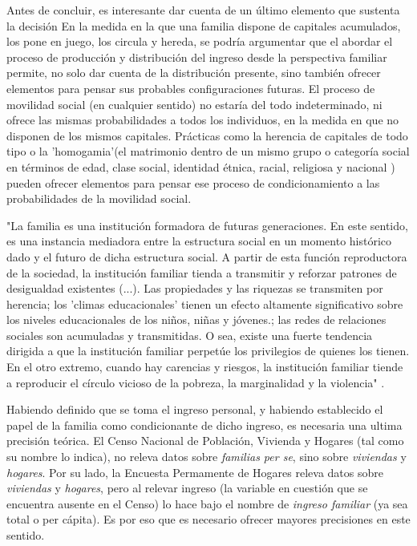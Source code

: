 	
	Antes de concluir, es interesante dar cuenta de un último elemento que sustenta la decisión En la medida en la que una familia dispone de capitales acumulados, los pone en juego, los circula y hereda, se podría argumentar que el abordar el proceso de producción y distribución del ingreso desde la perspectiva familiar permite, no solo dar cuenta de la distribución presente, sino también ofrecer elementos para pensar sus probables configuraciones futuras. El proceso de movilidad social (en cualquier sentido) no estaría del todo indeterminado, ni ofrece las mismas probabilidades a todos los individuos, en la medida en que no disponen de los mismos capitales. Prácticas como la herencia de capitales de todo tipo o la 'homogamia'(el matrimonio dentro de un mismo grupo o categoría social en términos de edad, clase social, identidad étnica, racial, religiosa y nacional \cite[p.~31]{jelin}) pueden ofrecer elementos para pensar ese proceso de condicionamiento a las probabilidades de la movilidad social.
	
	"La familia es una institución formadora de futuras generaciones. En este sentido, es una instancia mediadora entre la estructura social en un momento histórico dado y el futuro de dicha estructura social. A partir de esta función reproductora de la sociedad, la institución familiar tienda a transmitir y reforzar patrones de desigualdad existentes (...). Las propiedades y las riquezas se transmiten por herencia; los 'climas educacionales' tienen un efecto altamente significativo sobre los niveles educacionales de los niños, niñas y jóvenes.; las redes de relaciones sociales son acumuladas y transmitidas. O sea, existe una fuerte tendencia dirigida a que la institución familiar perpetúe los privilegios de quienes los tienen. En el otro extremo, cuando hay carencias y riesgos, la institución familiar tiende a reproducir el círculo vicioso de la pobreza, la marginalidad y la violencia" \cite[p.~197]{jelin}.
	
	Habiendo definido que se toma el ingreso personal, y habiendo establecido el papel de la familia como condicionante de dicho ingreso, es necesaria una ultima precisión teórica. El Censo Nacional de Población, Vivienda y Hogares (tal como su nombre lo indica), no releva datos sobre \textit{familias per se}, sino sobre \textit{viviendas} y \textit{hogares}. Por su lado, la Encuesta Permamente de Hogares releva datos sobre \textit{viviendas} y \textit{hogares}, pero al relevar ingreso (la variable en cuestión que se encuentra ausente en el Censo) lo hace bajo el nombre de \textit{ingreso familiar} (ya sea total o per cápita). Es por eso que es necesario ofrecer mayores precisiones en este sentido. 
	
